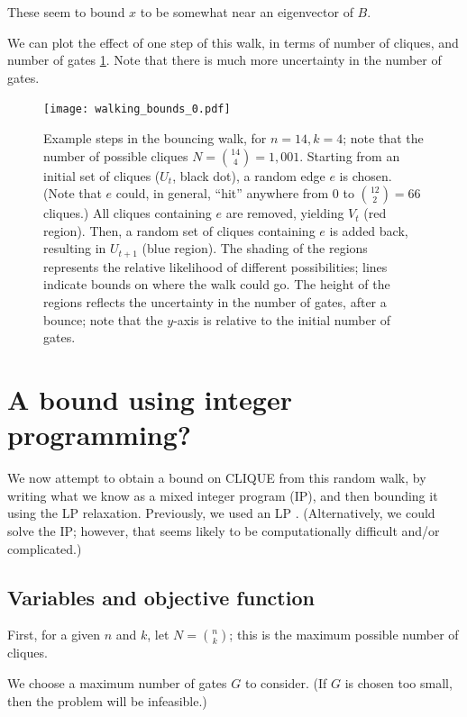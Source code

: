 \documentclass[12pt]{article}
\theoremstyle{definition}
\begin{document}
These seem to bound $x$ to be somewhat near an eigenvector of $B$.

We can plot the effect of one step of this walk, in terms of number of cliques, and number of gates \ref{fig:walk}.
Note that there is much more uncertainty in the number of gates.

\begin{figure}

\centering

\texttt{[image: walking\_bounds\_0.pdf]}

\caption{
Example steps in the bouncing walk, for $n=14, k=4$; 
note that the number of possible cliques $N = {14 \choose 4} = 1,001$.
 Starting from an initial set of cliques ($U_t$, black dot),
a random edge $e$ is chosen. (Note that $e$ could, in general,
``hit'' anywhere from 0 to ${12 \choose 2} = 66$ cliques.)
 All cliques containing $e$ are removed, yielding $V_t$ (red region).
Then, a random set of cliques containing $e$ is added back, resulting in $U_{t+1}$ (blue region).
The shading of the regions represents the relative likelihood of different possibilities;
lines indicate bounds on where the walk could go.
The height of the regions reflects the uncertainty in the number
of gates, after a bounce; note that the $y$-axis is relative to the initial number of gates.
}
\label{fig:walk}

\end{figure}


\section{A bound using integer programming?}

We now attempt to obtain a bound on CLIQUE from this random walk, by
writing what we know as a mixed integer program (IP), and then bounding it
using the LP relaxation. Previously, we used an LP \cite{buggyclique}.
(Alternatively, we could solve the IP; however, that seems likely to
be computationally difficult and/or complicated.)

\subsection{Variables and objective function}

First, for a given $n$ and $k$, let $N = {n \choose k}$; this is
the maximum possible number of cliques.

We choose a maximum number of gates $G$ to consider. (If $G$ is
chosen too small, then the problem will be infeasible.)
\end{document}
